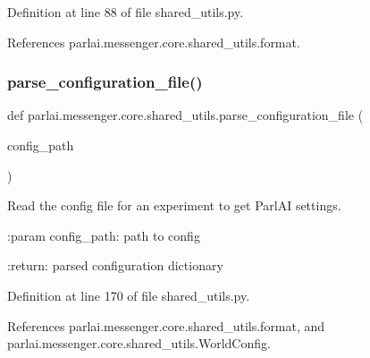 Definition at line 88 of file shared\+\_\+utils.\+py.



References parlai.\+messenger.\+core.\+shared\+\_\+utils.\+format.

\mbox{\label{namespaceparlai_1_1messenger_1_1core_1_1shared__utils_ae8a8704d759812f55b4228b5b913b99a}} 
\subsubsection{\texorpdfstring{parse\+\_\+configuration\+\_\+file()}{parse\_configuration\_file()}}
{\footnotesize\ttfamily def parlai.\+messenger.\+core.\+shared\+\_\+utils.\+parse\+\_\+configuration\+\_\+file (\begin{DoxyParamCaption}\item[{}]{config\+\_\+path }\end{DoxyParamCaption})}

\begin{DoxyVerb}Read the config file for an experiment to get ParlAI settings.

:param config_path:
    path to config

:return:
    parsed configuration dictionary
\end{DoxyVerb}
 

Definition at line 170 of file shared\+\_\+utils.\+py.



References parlai.\+messenger.\+core.\+shared\+\_\+utils.\+format, and parlai.\+messenger.\+core.\+shared\+\_\+utils.\+World\+Config.

\mbox{\label{namespaceparlai_1_1messenger_1_1core_1_1shared__utils_a9e67fcc4b560457a8945eaa7f1c11b5c}} 
